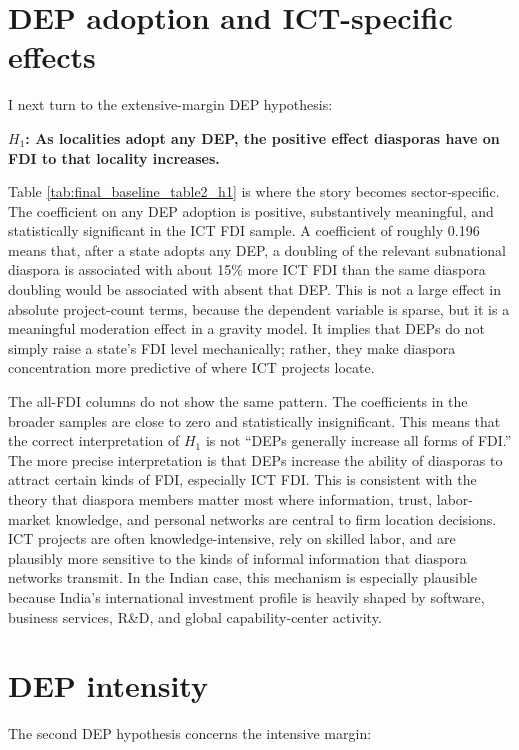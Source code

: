 \documentclass[doublespace,nopageskip]{UVAthesis}
\begin{document}
\section{DEP adoption and ICT-specific effects}

I next turn to the extensive-margin DEP hypothesis:

\textbf{$H_1$: As localities adopt any DEP, the positive effect diasporas have on FDI to that locality increases.}

Table \ref{tab:final_baseline_table2_h1} is where the story becomes sector-specific. The coefficient on any DEP adoption is positive, substantively meaningful, and statistically significant in the ICT FDI sample. A coefficient of roughly 0.196 means that, after a state adopts any DEP, a doubling of the relevant subnational diaspora is associated with about 15\% more ICT FDI than the same diaspora doubling would be associated with absent that DEP. This is not a large effect in absolute project-count terms, because the dependent variable is sparse, but it is a meaningful moderation effect in a gravity model. It implies that DEPs do not simply raise a state's FDI level mechanically; rather, they make diaspora concentration more predictive of where ICT projects locate.

The all-FDI columns do not show the same pattern. The coefficients in the broader samples are close to zero and statistically insignificant. This means that the correct interpretation of $H_1$ is not ``DEPs generally increase all forms of FDI.'' The more precise interpretation is that DEPs increase the ability of diasporas to attract certain kinds of FDI, especially ICT FDI. This is consistent with the theory that diaspora members matter most where information, trust, labor-market knowledge, and personal networks are central to firm location decisions. ICT projects are often knowledge-intensive, rely on skilled labor, and are plausibly more sensitive to the kinds of informal information that diaspora networks transmit. In the Indian case, this mechanism is especially plausible because India's international investment profile is heavily shaped by software, business services, R\&D, and global capability-center activity.

\section{DEP intensity}

The second DEP hypothesis concerns the intensive margin:
\end{document}
